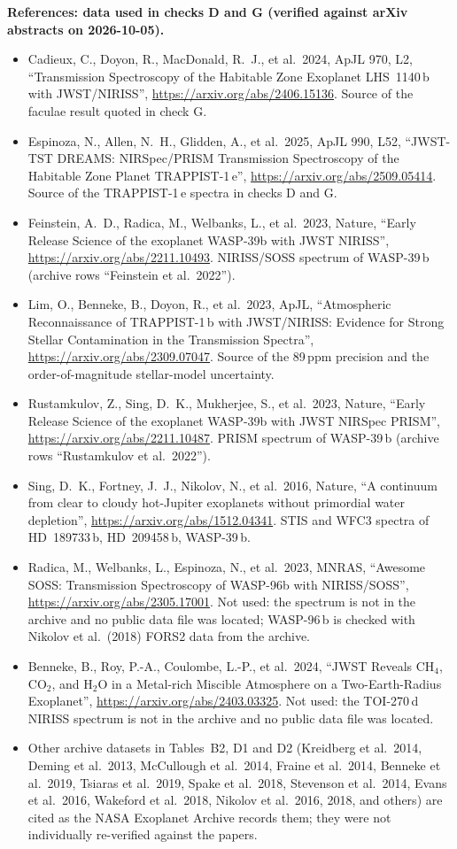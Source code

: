 \documentclass[11pt]{article}
\begin{document}
\textbf{References: data used in checks D and G (verified against arXiv abstracts on 2026-10-05).}
\begin{itemize}[leftmargin=*,itemsep=0pt]\small
  \item Cadieux, C., Doyon, R., MacDonald, R.~J., et al.\ 2024, ApJL 970, L2, ``Transmission Spectroscopy of the Habitable Zone Exoplanet LHS~1140\,b with JWST/NIRISS'', \url{https://arxiv.org/abs/2406.15136}. Source of the faculae result quoted in check G.
  \item Espinoza, N., Allen, N.~H., Glidden, A., et al.\ 2025, ApJL 990, L52, ``JWST-TST DREAMS: NIRSpec/PRISM Transmission Spectroscopy of the Habitable Zone Planet TRAPPIST-1\,e'', \url{https://arxiv.org/abs/2509.05414}. Source of the TRAPPIST-1\,e spectra in checks D and G.
  \item Feinstein, A.~D., Radica, M., Welbanks, L., et al.\ 2023, Nature, ``Early Release Science of the exoplanet WASP-39b with JWST NIRISS'', \url{https://arxiv.org/abs/2211.10493}. NIRISS/SOSS spectrum of WASP-39\,b (archive rows ``Feinstein et al.\ 2022'').
  \item Lim, O., Benneke, B., Doyon, R., et al.\ 2023, ApJL, ``Atmospheric Reconnaissance of TRAPPIST-1\,b with JWST/NIRISS: Evidence for Strong Stellar Contamination in the Transmission Spectra'', \url{https://arxiv.org/abs/2309.07047}. Source of the 89\,ppm precision and the order-of-magnitude stellar-model uncertainty.
  \item Rustamkulov, Z., Sing, D.~K., Mukherjee, S., et al.\ 2023, Nature, ``Early Release Science of the exoplanet WASP-39b with JWST NIRSpec PRISM'', \url{https://arxiv.org/abs/2211.10487}. PRISM spectrum of WASP-39\,b (archive rows ``Rustamkulov et al.\ 2022'').
  \item Sing, D.~K., Fortney, J.~J., Nikolov, N., et al.\ 2016, Nature, ``A continuum from clear to cloudy hot-Jupiter exoplanets without primordial water depletion'', \url{https://arxiv.org/abs/1512.04341}. STIS and WFC3 spectra of HD~189733\,b, HD~209458\,b, WASP-39\,b.
  \item Radica, M., Welbanks, L., Espinoza, N., et al.\ 2023, MNRAS, ``Awesome SOSS: Transmission Spectroscopy of WASP-96b with NIRISS/SOSS'', \url{https://arxiv.org/abs/2305.17001}. Not used: the spectrum is not in the archive and no public data file was located; WASP-96\,b is checked with Nikolov et al.\ (2018) FORS2 data from the archive.
  \item Benneke, B., Roy, P.-A., Coulombe, L.-P., et al.\ 2024, ``JWST Reveals CH$_4$, CO$_2$, and H$_2$O in a Metal-rich Miscible Atmosphere on a Two-Earth-Radius Exoplanet'', \url{https://arxiv.org/abs/2403.03325}. Not used: the TOI-270\,d NIRISS spectrum is not in the archive and no public data file was located.
  \item Other archive datasets in Tables~B2, D1 and D2 (Kreidberg et al.\ 2014, Deming et al.\ 2013, McCullough et al.\ 2014, Fraine et al.\ 2014, Benneke et al.\ 2019, Tsiaras et al.\ 2019, Spake et al.\ 2018, Stevenson et al.\ 2014, Evans et al.\ 2016, Wakeford et al.\ 2018, Nikolov et al.\ 2016, 2018, and others) are cited as the NASA Exoplanet Archive records them; they were not individually re-verified against the papers.
\end{itemize}
\end{document}

